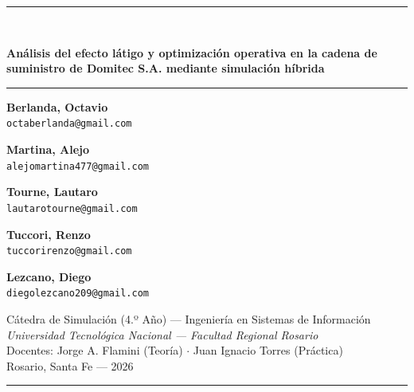 \documentclass[11pt, a4paper]{article}
\newcommand{\autor}[2]{%
    \begin{minipage}[t]{0.32\textwidth}\centering
        {\normalsize\bfseries #1}\\[1pt]
        {\footnotesize\texttt{#2}}
    \end{minipage}}
\begin{document}
\begin{center}
    \textcolor{azulUTN}{\rule{\textwidth}{1.2pt}}\\[0.5cm]
    {\LARGE\bfseries\color{azulUTN} Análisis del efecto látigo y optimización operativa en la cadena de suministro de Domitec S.A. mediante simulación híbrida\par}
    \vspace{0.3cm}
    \textcolor{azulUTN}{\rule{\textwidth}{0.4pt}}

    \vspace{0.5cm}
    \autor{Berlanda, Octavio}{octaberlanda@gmail.com}\hfill
    \autor{Martina, Alejo}{alejomartina477@gmail.com}\hfill
    \autor{Tourne, Lautaro}{lautarotourne@gmail.com}

    \vspace{0.4cm}
    \autor{Tuccori, Renzo}{tuccorirenzo@gmail.com}\hspace{0.04\textwidth}
    \autor{Lezcano, Diego}{diegolezcano209@gmail.com}

    \vspace{0.5cm}
    {\small
    Cátedra de Simulación (4.º Año) --- Ingeniería en Sistemas de Información\\[2pt]
    \textit{Universidad Tecnológica Nacional --- Facultad Regional Rosario}\\[2pt]
    Docentes: Jorge A. Flamini (Teoría) $\cdot$ Juan Ignacio Torres (Práctica)\\[2pt]
    Rosario, Santa Fe --- 2026\par}

    \vspace{0.3cm}
    \textcolor{azulUTN}{\rule{\textwidth}{0.4pt}}
\end{center}

\vspace{0.2cm}
\end{document}
